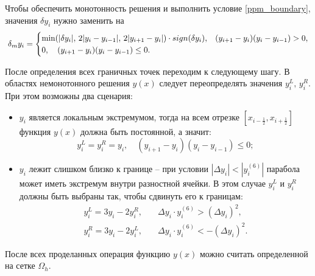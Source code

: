 \documentclass[12pt,a4paper]{article}
\newcommand{\half}{\frac{1}{2}}
\newcommand*{\Scale}[2][4]{\scalebox{#1}{$#2$}}
\begin{document}
    Чтобы обеспечить монотонность решения и выполнить условие \eqref{ppm_boundary}, значения $ \delta y_i $ нужно заменить на 
    \[
        \Scale[0.95] {
            \delta_m y_i = 
            \begin{cases}
                \min(|\delta y_i|,\, 2|y_i - y_{i-1}|,\, 2|y_{i+1} - y_i|)\cdot sign(\delta y_i), & (y_{i+1} - y_i)(y_i - y_{i-1}) > 0, \\
                0, \quad (y_{i+1} - y_i)(y_i - y_{i-1}) \leq 0.
            \end{cases}  
        }
    \]

    После определения всех граничных точек переходим к следующему шагу. В областях немонотонного решения $ y(x) $ следует переопределять значения $ y_i^L,\, y_i^R $. При этом возможны два сценария:
    \begin{itemize}
        \item $ y_i $ является локальным экстремумом, тогда на всем отрезке $ [x_{i-\half}, x_{i+\half}] $ функция $ y(x) $ должна быть постоянной, а значит:
        \begin{equation}
            \label{local_sup}
            y_i^L = y_i^R = y_i, \quad (y_{i+1} - y_i)(y_i - y_{i-1}) \leq 0;
        \end{equation}
                
        \item $ y_i $ лежит слишком близко к границе -- при условии $|\Delta y_i| < | y_i^{(6)} |$ парабола может иметь экстремум внутри разностной ячейки. В этом случае $ y_i^L $ и $ y_i^R $ должны быть выбраны так, чтобы сдвинуть его к границам:
        \begin{equation}
            \label{boundary_sup}
            \begin{split}
                y_i^L = 3y_i -2y_i^R, &\quad \Delta y_i \cdot y_i^{(6)} > (\Delta y_i)^2, \\
                y_i^R = 3y_i -2y_i^L, &\quad \Delta y_i \cdot y_i^{(6)} < -(\Delta y_i)^2.
            \end{split}  
        \end{equation}
    \end{itemize}

    После всех проделанных операция функцию $y(x)$ можно считать определенной на сетке $\Omega_h$. 
    
\end{document}
